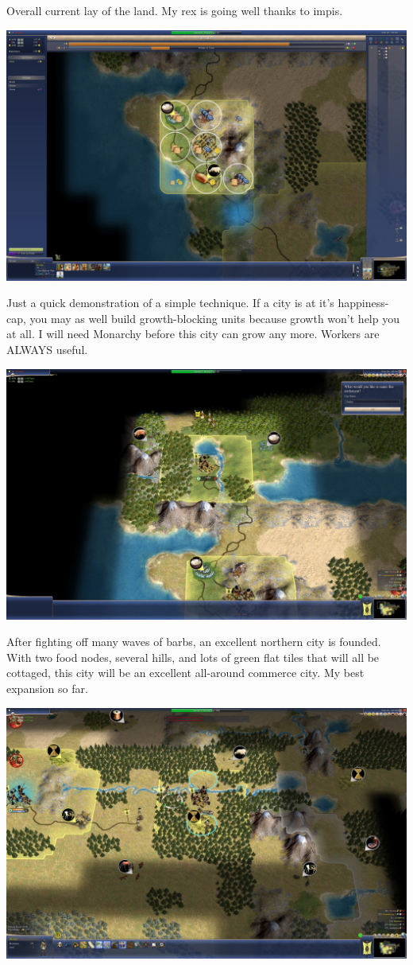 \documentclass[10pt]{article}
\begin{document}
Overall current lay of the land. My rex is going well thanks to impis.

\includegraphics[width=1.0\textwidth]{56}

Just a quick demonstration of a simple technique. If a city is at it's happiness-cap, you may as well build
growth-blocking units because growth won't help you at all. I will need Monarchy before this city can
grow any more. Workers are ALWAYS useful.

\includegraphics[width=1.0\textwidth]{57}

After fighting off many waves of barbs, an excellent northern city is founded. With two food nodes, several
hills, and lots of green flat tiles that will all be cottaged, this city will be an excellent all-around
commerce city. My best expansion so far.

\includegraphics[width=1.0\textwidth]{58}
\end{document}
